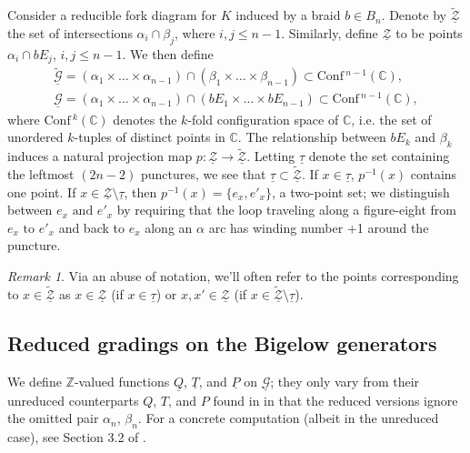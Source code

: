 \documentclass[11pt]{article}
\theoremstyle{plain} \newtheorem{thm}{Theorem}[subsection]
\theoremstyle{plain} \newtheorem{cor}[thm]{Corollary}
\theoremstyle{plain} \newtheorem{prop}[thm]{Proposition}
\theoremstyle{plain} \newtheorem{conj}[thm]{Conjecture}
\theoremstyle{plain} \newtheorem{lem}[thm]{Lemma}
\theoremstyle{definition} \newtheorem{df}[thm]{Definition}
\theoremstyle{remark} \newtheorem{rmk}[thm]{Remark}
\theoremstyle{remark} \newtheorem{obs}[thm]{Observation}
\newcommand{\B}[1]{B_{#1} }
\newcommand{\Ztil}{\tld{\mathcal{Z}}}
\newcommand{\Zcal}{\mathcal{Z}}
\newcommand{\G}{\mathcal{G}}
\newcommand{\tld}[1]{\widetilde{#1}}
\newcommand{\Gtil}{\tld{\mathcal{G}}}
\newcommand{\conf}[1]{\text{Conf}\,^{#1}(\mathbb{C})}
\newcommand{\red}[1]{\underline{#1}}
\newcommand{\by}{\mathbf{y}}
\numberwithin{equation}{section}
\begin{document}
Consider a reducible fork diagram for $K$ induced by a braid $b \in \B{n}$.  Denote by $\red{\Ztil}$ the set of intersections $\alpha_{i} \cap \beta_{j}$, where $i,j \leq n-1$.  Similarly, define $\red{\Zcal}$ to be points $\alpha_{i} \cap b E_{j}$, $i,j \leq n-1$.  We then define
\begin{align*}
\underline{\Gtil} = (\alpha_{1} \times \ldots \times \alpha_{n-1}) \cap (\beta_{1} \times \ldots \times \beta_{n-1}) \subset \conf{n-1}, \\
\underline{\G} = (\alpha_{1} \times \ldots \times \alpha_{n-1}) \cap (bE_{1} \times \ldots \times bE_{n-1}) \subset \conf{n-1},
\end{align*}
where $\conf{k}$ denotes the $k$-fold configuration space of $\mathbb{C}$, i.e. the set of unordered $k$-tuples of distinct points in $\mathbb{C}$.  The relationship between $bE_k$ and $\beta_k$ induces a natural projection map $p: \red{\Zcal} \rightarrow \red{\Ztil}$.  Letting $\red{\tau}$ denote the set containing the leftmost $(2n-2)$ punctures, we see that $\red{\tau} \subset \red{\Ztil}$.  If $x \in \red{\tau}$, $p^{-1}(x)$ contains one point.  If $x \in \red{\Zcal} \setminus \red{\tau}$, then $p^{-1}(x) = \{ e_{x}, e'_{x} \}$, a two-point set; we  distinguish between $e_{x} \text{ and } e'_{x}$ by requiring that the loop traveling along a figure-eight from $e_{x} \text{ to } e'_{x}$ and back to $e_{x}$ along an $\alpha$ arc has winding number +1 around the puncture.

\begin{rmk} Via an abuse of notation, we'll often refer to the points corresponding to $x \in \red{\Ztil}$ as $x \in \red{\Zcal}$ (if $x \in \red{\tau}$) or $x,x' \in \red{\Zcal}$ (if $x \in \red{\Ztil} \setminus \red{\tau}$).
\end{rmk}


\subsection{Reduced gradings on the Bigelow generators}\label{sec:redgrad}

We define $\mathbb{Z}$-valued functions $\red{Q}$, $\red{T}$, and $\red{ P}$ on $\red{\G}$; they only vary from their unreduced counterparts $Q$, $T$, and $ P$ found in \cite{et:R} in that the reduced versions ignore the omitted pair $\alpha_n$, $\beta_n$.  For a concrete computation (albeit in the unreduced case), see Section 3.2 of \cite{et:R}.
\end{document}
